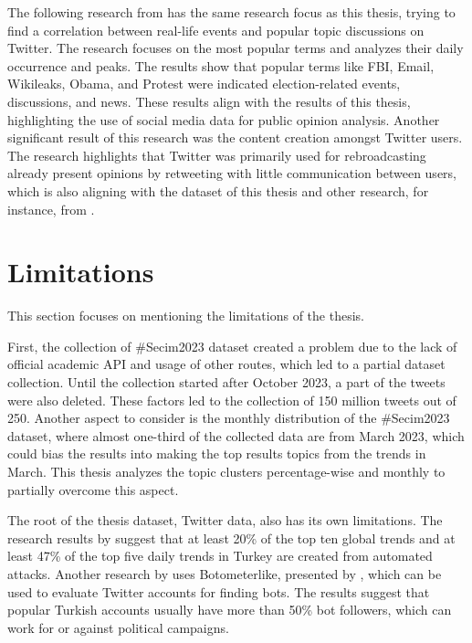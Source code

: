 The following research from \textcite{yaqub_US_election_analysis_2017} has the same research focus as 
this thesis, trying to find a correlation between real-life events and popular topic discussions on 
Twitter. The research focuses on the most popular terms and analyzes their daily occurrence and peaks. 
The results show that popular terms like FBI, Email, Wikileaks, Obama, and Protest were indicated 
election-related events, discussions, and news. These results align with the results of this thesis, 
highlighting the use of social media data for public opinion analysis. Another significant result of 
this research was the content creation amongst Twitter users. The research highlights that Twitter was 
primarily used for rebroadcasting already present opinions by retweeting with little communication 
between users, which is also aligning with the dataset of this thesis and other research, for 
instance, from \textcite{pfeffer_twitter_24_Hours_just_another_day_2023}.


\section{Limitations}

This section focuses on mentioning the limitations of the thesis. 

First, the collection of \#Secim2023 dataset created a problem due to the lack of official academic API and 
usage of other routes, which led to a partial dataset collection. Until the collection started after 
October 2023, a part of the tweets were also deleted. These factors led to the collection of 150 million 
tweets out of 250. Another aspect to consider is the monthly distribution of the \#Secim2023 dataset, 
where almost one-third of the collected data are from March 2023, which could bias the results into making 
the top results topics from the trends in March. This thesis analyzes the topic clusters percentage-wise 
and monthly to partially overcome this aspect.

The root of the thesis dataset, Twitter data, also has its own limitations. The research results by 
\textcite{elmas_fake_attack_2021} suggest that at least 20\% of the top ten global trends and at least 47\% 
of the top five daily trends in Turkey are created from automated attacks. Another research by 
\textcite{secim2023} uses Botometerlike, presented by \textcite{yang_botometer_2022}, which can be used 
to evaluate Twitter accounts for finding bots. The results suggest that popular Turkish accounts usually have more 
than 50\% bot followers, which can work for or against political campaigns. 

